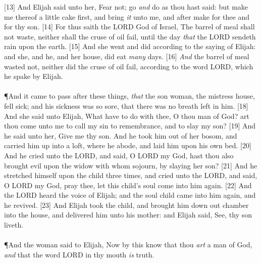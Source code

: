 [13] \textcolor[cmyk]{0.99998,1,0,0}{And Elijah said unto her, Fear not; go \emph{and} do as thou hast said: but make me thereof a little cake first, and bring \emph{it} unto me, and after make for thee and for thy son.}
[14] \textcolor[cmyk]{0.99998,1,0,0}{For thus saith the LORD God of Israel, The barrel of meal shall not waste, neither shall the cruse of oil fail, until the day \emph{that} the LORD sendeth rain upon the earth.}
[15] \textcolor[cmyk]{0.99998,1,0,0}{And she went and did according to the saying of Elijah: and she, and he, and her house, did eat \emph{many} days.}
[16] \textcolor[cmyk]{0.99998,1,0,0}{\emph{And} the barrel of meal wasted not, neither did the cruse of oil fail, according to the word  LORD, which he spake by Elijah.}\\
\\
\P  \textcolor[cmyk]{0.99998,1,0,0}{And it came to pass after these things, \emph{that} the son  woman, the mistress  house, fell sick; and his sickness was so sore, that there was no breath left in him.}
[18] \textcolor[cmyk]{0.99998,1,0,0}{And she said unto Elijah, What have  to do with thee, O thou man of God? art thou come unto me to call my sin to remembrance, and to slay my son?}
[19] \textcolor[cmyk]{0.99998,1,0,0}{And he said unto her, Give me thy son. And he took him out of her bosom, and carried him up into a loft, where he abode, and laid him upon his own bed.}
[20] \textcolor[cmyk]{0.99998,1,0,0}{And he cried unto the LORD, and said, O LORD my God, hast thou also brought evil upon the widow with whom  sojourn, by slaying her son?}
[21] \textcolor[cmyk]{0.99998,1,0,0}{And he stretched himself upon the child three times, and cried unto the LORD, and said, O LORD my God,  pray thee, let this child's soul come into him again.}
[22] \textcolor[cmyk]{0.99998,1,0,0}{And the LORD heard the voice of Elijah; and the soul  child came into him again, and he revived.}
[23] \textcolor[cmyk]{0.99998,1,0,0}{And Elijah took the child, and brought him down out  chamber into the house, and delivered him unto his mother: and Elijah said, See, thy son liveth.}\\
\\
\P  \textcolor[cmyk]{0.99998,1,0,0}{And the woman said to Elijah, Now by this  know that thou \emph{art} a man of God, \emph{and} that the word  LORD in thy mouth \emph{is} truth.}